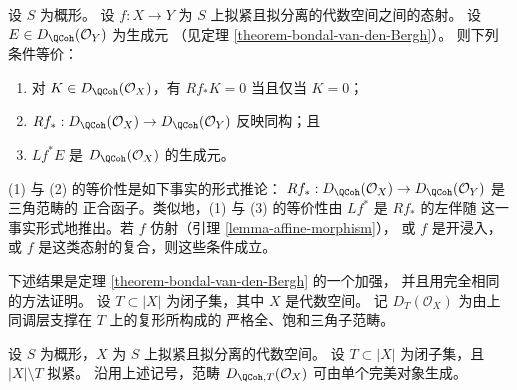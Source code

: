 \begin{remark}
\label{remark-pullback-generator}
设 $S$ 为概形。
设 $f : X \to Y$ 为 $S$ 上拟紧且拟分离的代数空间之间的态射。
设 $E \in D_\QCoh(\mathcal{O}_Y)$ 为生成元
（见定理 \ref{theorem-bondal-van-den-Bergh}）。
则下列条件等价：
\begin{enumerate}
\item 对 $K \in D_\QCoh(\mathcal{O}_X)$，有
$Rf_*K = 0$ 当且仅当 $K = 0$；
\item $Rf_* : D_\QCoh(\mathcal{O}_X) \to D_\QCoh(\mathcal{O}_Y)$
反映同构；且
\item $Lf^*E$ 是 $D_\QCoh(\mathcal{O}_X)$ 的生成元。
\end{enumerate}
(1) 与 (2) 的等价性是如下事实的形式推论：
$Rf_* : D_\QCoh(\mathcal{O}_X) \to D_\QCoh(\mathcal{O}_Y)$ 是三角范畴的
正合函子。类似地，(1) 与 (3) 的等价性由 $Lf^*$ 是 $Rf_*$ 的左伴随
这一事实形式地推出。若 $f$ 仿射（引理 \ref{lemma-affine-morphism}），
或 $f$ 是开浸入，或 $f$ 是这类态射的复合，则这些条件成立。
\end{remark}

\noindent
下述结果是定理 \ref{theorem-bondal-van-den-Bergh} 的一个加强，
并且用完全相同的方法证明。%
设 $T \subset |X|$ 为闭子集，其中 $X$ 是代数空间。
记 $D_T(\mathcal{O}_X)$ 为由上同调层支撑在 $T$ 上的复形所构成的
严格全、饱和三角子范畴。

\begin{lemma}
\label{lemma-generator-with-support}
设 $S$ 为概形，$X$ 为 $S$ 上拟紧且拟分离的代数空间。
设 $T \subset |X|$ 为闭子集，且 $|X| \setminus T$ 拟紧。
沿用上述记号，范畴 $D_{\QCoh, T}(\mathcal{O}_X)$ 可由单个完美对象生成。
\end{lemma}


